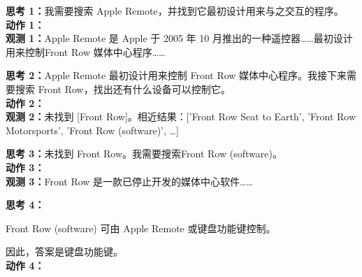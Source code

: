 \begin{minipage}[t]{.485\linewidth}
\vspace{0pt}
\raggedright
\begin{tcolorbox}[chTenPanel,title=ReAct]
\textbf{思考 1：}我需要搜索 Apple Remote，并找到它最初设计用来与之交互的程序。\\
\textbf{动作 1：}\\
\textbf{观测 1：}Apple Remote 是 Apple 于 2005 年 10 月推出的一种遥控器……最初设计用来控制\colorbox{green!25}{Front Row 媒体中心}程序……

\smallskip
\textbf{思考 2：}Apple Remote 最初设计用来控制 Front Row 媒体中心程序。我接下来需要搜索 Front Row，找出还有什么设备可以控制它。\\
\textbf{动作 2：}\\
\textbf{观测 2：}未找到 [Front Row]。相近结果：['Front Row Seat to Earth', 'Front Row Motorsports', '\textcolor{green!35!black}{Front Row (software)}', …]

\smallskip
\textbf{思考 3：}未找到 Front Row。我需要搜索\textcolor{green!35!black}{Front Row (software)}。\\
\textbf{动作 3：}\\
\textbf{观测 3：}Front Row 是一款已停止开发的媒体中心软件……

\smallskip
\textbf{思考 4：}\par
\noindent\colorbox{green!25}{\parbox{\dimexpr\linewidth-2\fboxsep\relax}{Front Row (software) 可由 Apple Remote 或键盘功能键控制。}}\par
\noindent 因此，答案是键盘功能键。\\
\textbf{动作 4：}\chTenGood
\end{tcolorbox}
\end{minipage}
\endgroup
